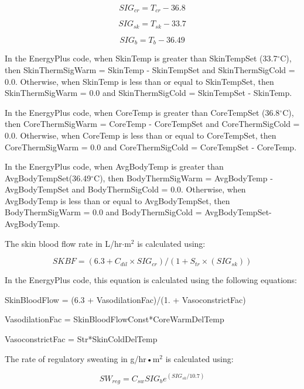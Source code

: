 \begin{equation}
SI{G_{cr}} = {T_{cr}} - 36.8
\end{equation}

\begin{equation}
SI{G_{sk}} = {T_{sk}} - 33.7
\end{equation}

\begin{equation}
SI{G_b} = {T_b} - 36.49
\end{equation}

In the EnergyPlus code, when SkinTemp is greater than SkinTempSet (33.7$^{\circ}$C), then SkinThermSigWarm = SkinTemp - SkinTempSet and 
SkinThermSigCold = 0.0. Otherwise, when SkinTemp is less than or equal to SkinTempSet, then SkinThermSigWarm = 0.0 and SkinThermSigCold = SkinTempSet - SkinTemp.

In the EnergyPlus code, when CoreTemp is greater than CoreTempSet (36.8$^{\circ}$C), then CoreThermSigWarm = CoreTemp - CoreTempSet and CoreThermSigCold = 0.0. Otherwise, when CoreTemp is less than or equal to CoreTempSet, then CoreThermSigWarm = 0.0 and CoreThermSigCold = CoreTempSet - CoreTemp.

In the EnergyPlus code, when AvgBodyTemp is greater than AvgBodyTempSet(36.49$^{\circ}$C), then BodyThermSigWarm = AvgBodyTemp - AvgBodyTempSet and BodyThermSigCold = 0.0. Otherwise, when AvgBodyTemp is less than or equal to AvgBodyTempSet, then BodyThermSigWarm = 0.0 and BodyThermSigCold = AvgBodyTempSet-AvgBodyTemp.

The skin blood flow rate in L/hr$\cdot$m\(^{2}\) is calculated using:

\begin{equation}
SKBF = (6.3 + C{}_{dil} \times SI{G_{cr}})/(1 + {S_{tr}} \times (SI{G_{sk}}))
\end{equation}

In the EnergyPlus code, this equation is calculated using the following equations:

SkinBloodFlow = (6.3 + VasodilationFac)/(1. + VasoconstrictFac)

VasodilationFac = SkinBloodFlowConst*CoreWarmDelTemp

VasoconstrictFac = Str*SkinColdDelTemp

The rate of regulatory sweating in g/hr•m\(^{2}\) is calculated using:

\begin{equation}
S{W_{reg}} = {C_{sw}}SI{G_b}{e^{(SI{G_{sk}}/10.7)}}
\end{equation}

